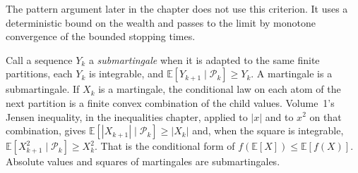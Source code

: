 The pattern argument later in the chapter does not use this criterion. It uses a deterministic bound on the wealth and passes to the limit by monotone convergence of the bounded stopping times.

Call a sequence $Y_k$ a \emph{submartingale} when it is adapted to the same finite partitions, each $Y_k$ is integrable, and $\mathbb E[Y_{k+1}\mid\mathcal P_k]\ge Y_k$. A martingale is a submartingale. If $X_k$ is a martingale, the conditional law on each atom of the next partition is a finite convex combination of the child values. Volume~1's Jensen inequality, in the inequalities chapter, applied to $|x|$ and to $x^2$ on that combination, gives $\mathbb E[|X_{k+1}|\mid\mathcal P_k]\ge|X_k|$ and, when the square is integrable, $\mathbb E[X_{k+1}^2\mid\mathcal P_k]\ge X_k^2$. That is the conditional form of $f(\mathbb E[X])\le\mathbb E[f(X)]$. Absolute values and squares of martingales are submartingales.

